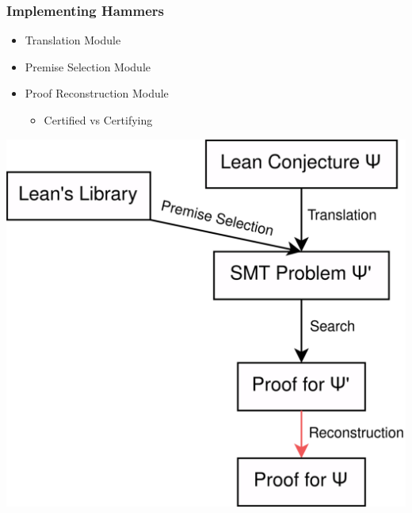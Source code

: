 \documentclass[usepdftitle=false,aspectratio=169,usenames,dvipsnames]{beamer}
\newcommand\vitem{\vfill\item}
\begin{document}
\begin{frame}
  \frametitle{Implementing Hammers}
  \begin{minipage}[c][0.55 \textheight]{0.45 \textwidth}
    \begin{itemize}
      \item Translation Module
      \vitem Premise Selection Module
      \vitem Proof Reconstruction Module
      \begin{itemize}
        \item{Certified vs Certifying}
      \end{itemize}
    \end{itemize}
  \end{minipage}
  \begin{minipage}{0.44 \textwidth}
    \centering
    \includegraphics[height=0.65\textheight]{images/pic5.png}
  \end{minipage}
\end{frame}

\end{document}
